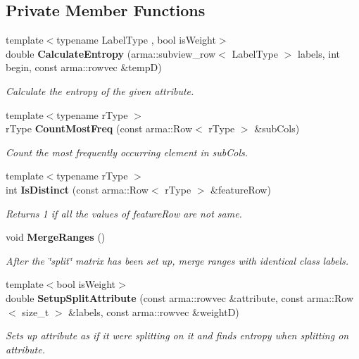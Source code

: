\subsection*{Private Member Functions}
\begin{DoxyCompactItemize}
\item 
{\footnotesize template$<$typename Label\-Type , bool is\-Weight$>$ }\\double {\bf Calculate\-Entropy} (arma\-::subview\-\_\-row$<$ Label\-Type $>$ labels, int begin, const arma\-::rowvec \&temp\-D)
\begin{DoxyCompactList}\small\item\em Calculate the entropy of the given attribute. \end{DoxyCompactList}\item 
{\footnotesize template$<$typename r\-Type $>$ }\\r\-Type {\bf Count\-Most\-Freq} (const arma\-::\-Row$<$ r\-Type $>$ \&sub\-Cols)
\begin{DoxyCompactList}\small\item\em Count the most frequently occurring element in sub\-Cols. \end{DoxyCompactList}\item 
{\footnotesize template$<$typename r\-Type $>$ }\\int {\bf Is\-Distinct} (const arma\-::\-Row$<$ r\-Type $>$ \&feature\-Row)
\begin{DoxyCompactList}\small\item\em Returns 1 if all the values of feature\-Row are not same. \end{DoxyCompactList}\item 
void {\bf Merge\-Ranges} ()
\begin{DoxyCompactList}\small\item\em After the \char`\"{}split\char`\"{} matrix has been set up, merge ranges with identical class labels. \end{DoxyCompactList}\item 
{\footnotesize template$<$bool is\-Weight$>$ }\\double {\bf Setup\-Split\-Attribute} (const arma\-::rowvec \&attribute, const arma\-::\-Row$<$ size\-\_\-t $>$ \&labels, const arma\-::rowvec \&weight\-D)
\begin{DoxyCompactList}\small\item\em Sets up attribute as if it were splitting on it and finds entropy when splitting on attribute. \end{DoxyCompactList}\item 

\end{DoxyCompactItemize}
